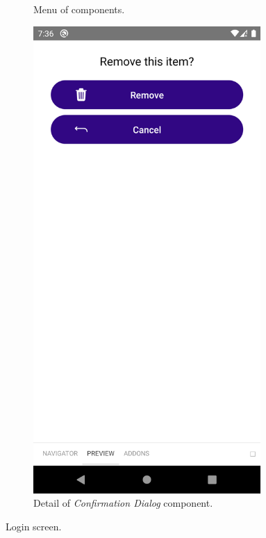 \documentclass[
  digital, %
  table,   %
  oneside, %
  lof,     %
  lot,     %
]{fithesis3}
\begin{document}
\begin{figure}
\begin{subfigure}[t]{0.5\textwidth}
      \caption{Menu of components.}
      \label{fig:storybook_rn_menu}
    \end{subfigure}%
    \begin{subfigure}[t]{0.5\textwidth}
      \centering
      \includegraphics[width=0.95\textwidth]{figures/other/storybook_rn_confirm_delete_component}
      \caption{Detail of \textit{Confirmation Dialog} component.}
      \label{fig:storybook_rn_confirm_delete_component}
    \end{subfigure}
    \caption{Login screen.}
\end{figure}
\label{fig:storybook_rn}
\end{document}
